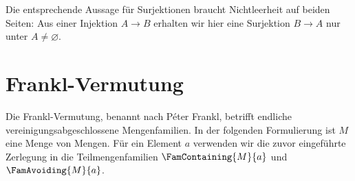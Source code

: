 \documentclass[main.tex]{subfiles}
\begin{document}
Die entsprechende Aussage für Surjektionen braucht Nichtleerheit auf beiden
Seiten: Aus einer Injektion \(A\to B\) erhalten wir hier eine Surjektion
\(B\to A\) nur unter \(A\neq\varnothing\).

\begin{tabproof}


\end{tabproof}

\section{Frankl-Vermutung}

Die Frankl-Vermutung, benannt nach Péter Frankl, betrifft endliche
vereinigungsabgeschlossene Mengenfamilien. In der folgenden Formulierung ist
\(M\) eine Menge von Mengen.
Für ein Element \(a\) verwenden wir die zuvor eingeführte Zerlegung in die
Teilmengenfamilien \(\FamContaining{M}{a}\) und \(\FamAvoiding{M}{a}\).

\end{document}
